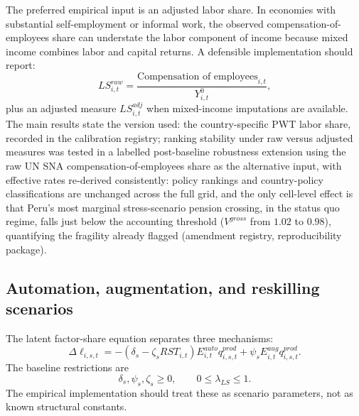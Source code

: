 \documentclass[11pt,a4paper]{article}
\begin{document}
The preferred empirical input is an adjusted labor share. In economies with substantial self-employment or informal work, the observed compensation-of-employees share can understate the labor component of income because mixed income combines labor and capital returns. A defensible implementation should report:
\begin{equation}
    LS^{raw}_{i,t}=\frac{\text{Compensation of employees}_{i,t}}{Y^0_{i,t}},
\end{equation}
plus an adjusted measure $LS^{adj}_{i,t}$ when mixed-income imputations are available. The main results state the version used: the country-specific PWT labor share, recorded in the calibration registry; ranking stability under raw versus adjusted measures was tested in a labelled post-baseline robustness extension using the raw UN SNA compensation-of-employees share as the alternative input, with effective rates re-derived consistently: policy rankings and country-policy classifications are unchanged across the full grid, and the only cell-level effect is that Peru's most marginal stress-scenario pension crossing, in the status quo regime, falls just below the accounting threshold ($V^{gross}$ from $1.02$ to $0.98$), quantifying the fragility already flagged (amendment registry, reproducibility package).

\subsection{Automation, augmentation, and reskilling scenarios}

The latent factor-share equation separates three mechanisms:
\begin{equation}
    \Delta \ell_{i,s,t}
    =
    -\left(\delta_s-\zeta_s RST_{i,t}\right)E^{auto}_{i,t}q^{prod}_{i,s,t}
    +\psi_s E^{aug}_{i,t}q^{prod}_{i,s,t}.
\end{equation}
The baseline restrictions are
\begin{equation}
    \delta_s,\psi_s,\zeta_s\geq0,
    \qquad
    0\leq \lambda_{LS}\leq1.
\end{equation}
The empirical implementation should treat these as scenario parameters, not as known structural constants.
\end{document}
